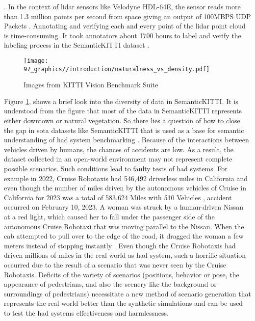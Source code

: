 \parencite{qi2017pointnet}. In the context of lidar sensors like Velodyne HDL-64E, the sensor reads more than 1.3 million points per second from space giving an output of 100MBPS UDP Packets \parencite{velodyne_64}. Annotating and verifying each and every point of the lidar point cloud is time-consuming. It took annotators about 1700 hours to label and verify the labeling process in the SemanticKITTI dataset \parencite{behley2019semantickitti}.

\begin{figure}[htbp]
    \centering
    \texttt{[image: 97\_graphics//introduction/naturalness\_vs\_density.pdf]}
    \caption{Images from KITTI Vision Benchmark Suite \parencite{Geiger2012CVPR}}
    \label{fig:introduction_surf_variation_in_kitti}
\end{figure}

Figure \ref{fig:introduction_surf_variation_in_kitti}, shows a brief look into the diversity of data in SemanticKITTI. It is understood from the figure that most of the data in SemanticKITTI represents either downtown or natural vegetation. So there lies a question of how to close the gap in \acrfull{sota} datasets like SemanticKITTI that is used as a base for semantic understanding of \acrshort{had} system benchmarking \parencite{papers-with-code}. Because of the interactions between vehicles driven by humans, the chances of accidents are low. As a result, the dataset collected in an open-world environment may not represent complete possible scenarios. Such conditions lead to faulty tests of \acrshort{had} systems. For example in 2022, Cruise Robotaxis had 546,492 driverless miles in California and even though the number of miles driven by the autonomous vehicles of Cruise in California for 2023 was a total of 583,624 Miles with 510 Vehicles \parencite{disengagement_report}, accident occurred on February 10, 2023. A woman was struck by a human-driven Nissan at a red light, which caused her to fall under the passenger side of the autonomous Cruise Robotaxi that was moving parallel to the Nissan. When the cab attempted to pull over to the edge of the road, it dragged the woman a few meters instead of stopping instantly \parencite{cruise_crash}. Even though the Cruise Robotaxis had driven millions of miles in the real world as \acrshort{had} system, such a horrific situation occurred due to the result of a scenario that was never seen by the Cruise Robotaxis. Deficits of the variety of scenarios (positions, behavior or pose, the appearance of pedestrians, and also the scenery like the background or surroundings of pedestrians) necessitate a new method of scenario generation that represents the real world better than the synthetic simulations and can be used to test the \acrshort{had} systems effectiveness and harmlessness.

